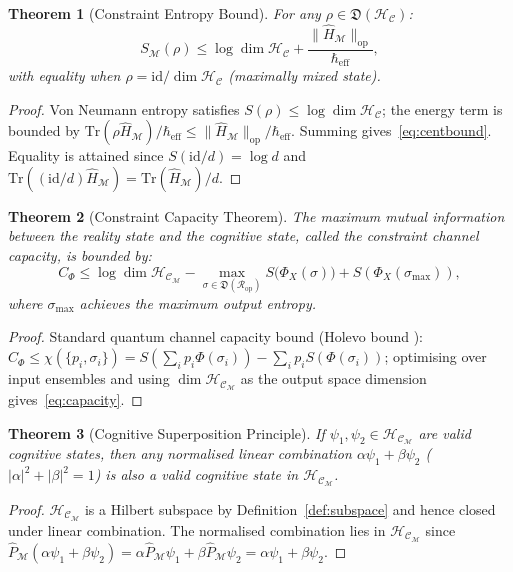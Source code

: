 \documentclass[twocolumn,aps,prd,superscriptaddress,nofootinbib]{revtex4-2}
\newtheorem{theorem}{Theorem}[section]
\newcommand{\HC}{\mathcal{H}_{\mathcal{C}}}
\newcommand{\CR}{\mathcal{R}}
\newcommand{\CM}{\mathcal{M}}
\newcommand{\hatH}{\hat{H}}
\newcommand{\hatP}{\hat{P}}
\newcommand{\Tr}{\mathrm{Tr}}
\newcommand{\id}{\mathrm{id}}
\begin{document}
\begin{theorem}[Constraint Entropy Bound]
\label{thm:entbound}
For any $\rho \in \mathfrak{D}(\HC)$:
\begin{equation}
  S_\CM(\rho) \leq \log\dim\HC + \frac{\|\hatH_\CM\|_{\mathrm{op}}}{\hbar_\mathrm{eff}},
  \label{eq:centbound}
\end{equation}
with equality when $\rho = \id/\dim\HC$ (maximally mixed state).
\end{theorem}

\begin{proof}
Von Neumann entropy satisfies $S(\rho) \leq \log\dim\HC$; the energy term is bounded by $\Tr(\rho\hatH_\CM)/\hbar_\mathrm{eff} \leq \|\hatH_\CM\|_\mathrm{op}/\hbar_\mathrm{eff}$.  Summing gives~\eqref{eq:centbound}.  Equality is attained since $S(\id/d) = \log d$ and $\Tr((\id/d)\hatH_\CM) = \Tr(\hatH_\CM)/d$.
\end{proof}

\begin{theorem}[Constraint Capacity Theorem]
\label{thm:capacity}
The maximum mutual information between the reality state and the cognitive
state, called the \emph{constraint channel capacity}, is bounded by:
\begin{equation}
  C_\Phi \leq \log\dim\HC_\CM
    - \max_{\sigma \in \mathfrak{D}(\CR_\mathrm{op})} S\bigl(\Phi_X(\sigma)\bigr)
    + S(\Phi_X(\sigma_\mathrm{max})),
  \label{eq:capacity}
\end{equation}
where $\sigma_\mathrm{max}$ achieves the maximum output entropy.
\end{theorem}

\begin{proof}
Standard quantum channel capacity bound (Holevo bound \cite{Holevo1973}):
$C_\Phi \leq \chi(\{p_i,\sigma_i\}) = S(\sum_i p_i\Phi(\sigma_i)) - \sum_i p_i S(\Phi(\sigma_i))$;
optimising over input ensembles and using $\dim\HC_\CM$ as the output space dimension gives~\eqref{eq:capacity}.
\end{proof}

\begin{theorem}[Cognitive Superposition Principle]
\label{thm:superposition}
If $\psi_1, \psi_2 \in \HC_\CM$ are valid cognitive states, then any
normalised linear combination $\alpha\psi_1 + \beta\psi_2$
($|\alpha|^2+|\beta|^2=1$) is also a valid cognitive state in $\HC_\CM$.
\end{theorem}

\begin{proof}
$\HC_\CM$ is a Hilbert subspace by Definition~\ref{def:subspace} and hence closed under linear combination.  The normalised combination lies in $\HC_\CM$ since $\hatP_\CM(\alpha\psi_1+\beta\psi_2) = \alpha\hatP_\CM\psi_1 + \beta\hatP_\CM\psi_2 = \alpha\psi_1+\beta\psi_2$.
\end{proof}
\end{document}
